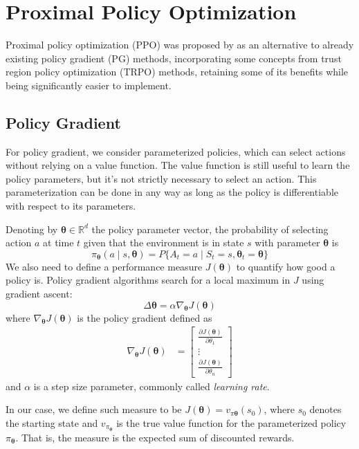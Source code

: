 \chapter{Proximal Policy Optimization}
Proximal policy optimization (PPO) was proposed by \cite{https://doi.org/10.48550/arxiv.1707.06347} as an alternative to already existing policy gradient (PG) methods, incorporating some concepts from trust region policy optimization (TRPO) methods, retaining some of its benefits while being significantly easier to implement.
\section{Policy Gradient}
For policy gradient, we consider parameterized policies, which can select actions without relying on a value function. The value function is still useful to learn the policy parameters, but it's not strictly necessary to select an action. This parameterization can be done in any way as long as the policy is differentiable with respect to its parameters.

Denoting by $\boldsymbol\theta \in \mathbb{R}^d$ the policy parameter vector, the probability of selecting action $a$ at time $t$ given that the environment is in state $s$ with parameter $\boldsymbol\theta$ is
\[
    \pi_{\boldsymbol\theta}(a \mid s, \boldsymbol\theta) = P\{A_t = a \mid S_t = s, \boldsymbol\theta_t = \boldsymbol\theta\}   
\]
We also need to define a performance measure $J(\boldsymbol\theta)$ to quantify how good a policy is. Policy gradient algorithms search for a local maximum in $J$ using gradient ascent:
\[
    \Delta\boldsymbol\theta = \alpha\nabla_{\boldsymbol\theta}J(\boldsymbol\theta)   
\]
where $\nabla_{\boldsymbol\theta}J(\boldsymbol\theta)$ is the policy gradient defined as
\begin{align*}
    \nabla_{\boldsymbol\theta}J(\boldsymbol\theta) &=
    \begin{bmatrix}
        \frac{\partial J(\boldsymbol\theta)}{\partial \theta_1} \\
        \vdots \\
        \frac{\partial J(\boldsymbol\theta)}{\partial \theta_n}
    \end{bmatrix}
\end{align*} 
and $\alpha$ is a step size parameter, commonly called \textit{learning rate}.    

In our case, we define such measure to be $J(\boldsymbol\theta) = v_{\pi{\boldsymbol\theta}}(s_0)$, where $s_0$ denotes the starting state and $v_{\pi_{\boldsymbol\theta}}$ is the true value function for the parameterized policy $\pi_{\boldsymbol\theta}$. That is, the measure is the expected sum of discounted rewards.

